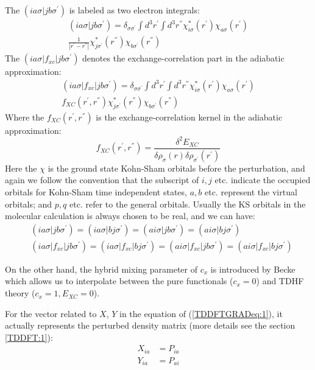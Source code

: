 The $(ia\sigma|jb\sigma^{'})$ is labeled as two electron integrals:
\begin{multline}\label{}
(ia\sigma|jb\sigma^{'}) = \delta_{\sigma\sigma^{'}}\int d^{3}r^{'}
\int
d^{3}r^{''}\chi^{*}_{i\sigma}(r^{'})\chi_{a\sigma}(r^{'}) \\
\frac{1}{|r^{'}-r^{''}|}
\chi^{*}_{j\sigma^{'}}(r^{''})\chi_{b\sigma^{'}}(r^{''})
\end{multline}
The $(ia\sigma|f_{xc}|jb\sigma^{'})$ denotes the
exchange-correlation part in the adiabatic approximation:
\begin{multline}\label{}
(ia\sigma|f_{xc}|jb\sigma^{'}) = \delta_{\sigma\sigma^{'}}\int
d^{3}r^{'} \int
d^{3}r^{''}\chi^{*}_{i\sigma}(r^{'})\chi_{a\sigma}(r^{'}) \\
f_{XC}(r^{'},r^{''})
\chi^{*}_{j\sigma^{'}}(r^{''})\chi_{b\sigma^{'}}(r^{''})
\end{multline}
Where the $f_{XC}(r^{'},r^{''})$ is the exchange-correlation kernel
in the adiabatic approximation:
\begin{equation}\label{}
f_{XC}(r^{'},r^{''}) = \frac{\delta^{2} E_{XC}}{
\delta\rho_{\sigma}(r)\delta\rho_{\sigma^{'}}(r^{'})}
\end{equation}
Here the $\chi$ is the ground state Kohn-Sham orbitals before the
perturbation, and again we follow the convention that the subscript
of $i,j$ etc. indicate the occupied orbitals for Kohn-Sham time
independent states, $a, b$ etc. represent the virtual orbitals; and
$p, q$ etc. refer to the general orbitals. Usually the KS orbitals
in the molecular calculation is always chosen to be real, and we can
have:
\begin{align}\label{}
&(ia\sigma|jb\sigma^{'})  = (ia\sigma|bj\sigma^{'}) =
(ai\sigma|jb\sigma^{'})  = (ai\sigma|bj\sigma^{'}) \nonumber \\
&(ia\sigma|f_{xc}|jb\sigma^{'})  = (ia\sigma|f_{xc}|bj\sigma^{'}) =
(ai\sigma|f_{xc}|jb\sigma^{'})  = (ai\sigma|f_{xc}|bj\sigma^{'})
\end{align}

On the other hand, the hybrid mixing parameter of $c_{x}$ is
introduced by Becke which allows us to interpolate between the pure
functionals ($c_{x} = 0$) and TDHF theory ($c_{x} = 1, E_{XC} = 0$).

For the vector related to $X$, $Y$ in the equation of
(\ref{TDDFTGRADeq:1}), it actually represents the perturbed density
matrix (more details see the section \ref{TDDFT:1}):
\begin{align}\label{}
X_{ia} &= P_{ia} \nonumber \\
Y_{ia} &= P_{ai}
\end{align}

